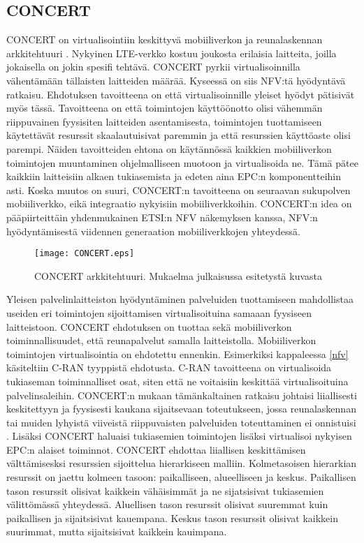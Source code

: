 \subsection{CONCERT} \label{concert}

CONCERT on virtualisointiin keskittyvä mobiiliverkon ja reunalaskennan arkkitehtuuri \cite{liu2014concert}.
Nykyinen LTE-verkko kostuu joukosta erilaisia laitteita, joilla jokaisella on jokin spesifi tehtävä.
CONCERT pyrkii virtualisoinnilla vähentämään tällaisten laitteiden määrää.
Kyseessä on siis NFV:tä hyödyntävä ratkaisu.
Ehdotuksen tavoitteena on että virtualisoinnille yleiset hyödyt pätisivät myös tässä.
Tavoitteena on että toimintojen käyttöönotto olisi vähemmän riippuvainen fyysisiten laitteiden asentamisesta, toimintojen tuottamiseen käytettävät resurssit skaalautuisivat paremmin ja että resurssien käyttöaste olisi parempi.
Näiden tavoitteiden ehtona on käytännössä kaikkien mobiiliverkon toimintojen muuntaminen ohjelmalliseen muotoon ja virtualisoida ne.
Tämä pätee kaikkiin laitteisiin alkaen tukiasemista ja edeten aina EPC:n komponentteihin asti.
Koska muutos on suuri, CONCERT:n tavoitteena on seuraavan sukupolven mobiiliverkko, eikä integraatio nykyisiin mobiiliverkkoihin.
CONCERT:n idea on pääpiirteittäin yhdenmukainen ETSI:n NFV näkemyksen \cite{etsinfv5g} kanssa, NFV:n hyödyntämisestä viidennen generaation mobiiliverkkojen yhteydessä.

\begin{figure}[tb]
\texttt{[image: CONCERT.eps]}
\caption{CONCERT arkkitehtuuri. Mukaelma julkaisussa \cite{liu2014concert} esitetystä kuvasta} \label{fig:concert}
\end{figure}

Yleisen palvelinlaitteiston hyödyntäminen palveluiden tuottamiseen mahdollistaa useiden eri toimintojen sijoittamisen virtualisoituina samaaan fyysiseen laitteistoon.
CONCERT ehdotuksen on tuottaa sekä mobiiliverkon toiminnallisuudet, että reunapalvelut samalla laitteistolla. 
Mobiiliverkon toimintojen virtualisointia on ehdotettu ennenkin. Esimerkiksi kappaleessa \ref{nfv} käsiteltiin C-RAN tyyppistä ehdotusta. C-RAN tavoitteena on virtualisoida tukiaseman toiminnalliset osat, siten että ne voitaisiin keskittää virtualisoituina palvelinsaleihin. 
CONCERT:n mukaan tämänkaltainen ratkaisu johtaisi liiallisesti keskitettyyn ja fyysisesti kaukana sijaitsevaan toteutukseen, jossa reunalaskennan tai muiden lyhyistä viiveistä riippuvaisten palveluiden toteuttaminen ei onnistuisi \cite{liu2014concert}. Lisäksi CONCERT haluaisi tukiasemien toimintojen lisäksi virtualisoi nykyisen EPC:n alaiset toiminnot.
CONCERT ehdottaa liiallisen keskittämisen välttämisesksi resurssien sijoittelua hierarkiseen malliin.
Kolmetasoisen hierarkian resurssit on jaettu kolmeen tasoon: paikalliseen, alueelliseen ja keskus. 
Paikallisen tason resurssit olisivat kaikkein vähäisimmät ja ne sijatsisivat tukiasemien välittömässä yhteydessä.
Aluellisen tason resurssit olisivat suuremmat kuin paikallisen ja sijaitsisivat kauempana.
Keskus tason resurssit olisivat kaikkein suurimmat, mutta sijaitsisivat kaikkein kauimpana. 

